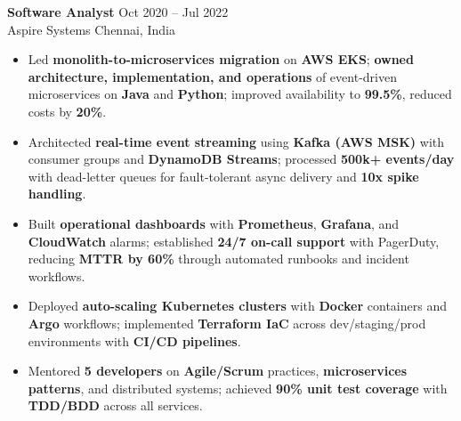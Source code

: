 \documentclass[letterpaper,10pt]{article}
\newcommand{\resumeItem}[1]{\item\small #1}
\newcommand{\resumeSubheading}[4]{
  \vspace{6pt}
  \noindent
  \textbf{#1} \hfill {\footnotesize #2} \\
  [-1pt]
  \noindent
  \small #3 \hfill {\small #4}
  \vspace{3pt}
}
\newcommand{\resumeItemsStart}{\vspace{-2pt}\begin{itemize}}
\newcommand{\resumeItemsEnd}{\end{itemize}\vspace{6pt}}
\begin{document}
\resumeSubheading
{Software Analyst}{Oct 2020 -- Jul 2022}
{Aspire Systems}{Chennai, India}
\resumeItemsStart
\resumeItem{Led \textbf{monolith-to-microservices migration} on \textbf{AWS EKS}; \textbf{owned architecture, implementation, and operations} of event-driven microservices on \textbf{Java} and \textbf{Python}; improved availability to \textbf{99.5\%}, reduced costs by \textbf{20\%}.}
\resumeItem{Architected \textbf{real-time event streaming} using \textbf{Kafka (AWS MSK)} with consumer groups and \textbf{DynamoDB Streams}; processed \textbf{500k+ events/day} with dead-letter queues for fault-tolerant async delivery and \textbf{10x spike handling}.}
\resumeItem{Built \textbf{operational dashboards} with \textbf{Prometheus}, \textbf{Grafana}, and \textbf{CloudWatch} alarms; established \textbf{24/7 on-call support} with PagerDuty, reducing \textbf{MTTR by 60\%} through automated runbooks and incident workflows.}
\resumeItem{Deployed \textbf{auto-scaling Kubernetes clusters} with \textbf{Docker} containers and \textbf{Argo} workflows; implemented \textbf{Terraform IaC} across dev/staging/prod environments with \textbf{CI/CD pipelines}.}
\resumeItem{Mentored \textbf{5 developers} on \textbf{Agile/Scrum} practices, \textbf{microservices patterns}, and distributed systems; achieved \textbf{90\% unit test coverage} with \textbf{TDD/BDD} across all services.}
\resumeItemsEnd
\vspace{-8pt}


\end{document}
